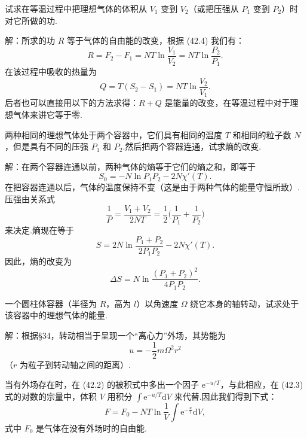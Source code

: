 \begin{xiti}

\quad 试求在等温过程中把理想气体的体积从 $V_1$ 变到 $V_2$（或把压强从 $P_1$ 变到 $P_2$）时对它所做的功.

解：所求的功 $R$ 等于气体的自由能的改变，根据 (42.4) 我们有：
\begin{equation*}
  R=F_2-F_1=NT\ln\frac{V_1}{V_2}=NT\ln\frac{P_2}{P_1}.
\end{equation*}
在该过程中吸收的热量为
\begin{equation*}
  Q=T\left(S_2-S_1\right)=NT\ln\frac{V_2}{V_1}.
\end{equation*}
后者也可以直接用以下的方法求得：$R+Q$ 是能量的改变，在等温过程中对于理想气体来讲它等于零.

\quad 两种相同的理想气体处于两个容器中，它们具有相同的温度 $T$ 和相同的粒子数 $N$，但是具有不同的压强 $P_1$ 和 $P_2$.然后把两个容器连通，试求熵的改变.

解：在两个容器连通以前，两种气体的熵等于它们的熵之和，即等于
\begin{equation*}
  S_0=-N\ln P_1P_2-2N\chi'(T).
\end{equation*}
在把容器连通以后，气体的温度保持不变（这是由于两种气体的能量守恒所致）.压强由关系式
\begin{equation*}
  \frac{1}{P}=\frac{V_1+V_2}{2NT}
  =\frac{1}{2}\Big(\frac{1}{P_1}+\frac{1}{P_2}\Big)
\end{equation*}
来决定.熵现在等于
\begin{equation*}
  S=2N\ln\frac{P_1+P_2}{2P_1P_2}-2N\chi'(T).
\end{equation*}
因此，熵的改变为
\begin{equation*}
  \Delta S=N\ln\frac{(P_1+P_2)^2}{4P_1P_2}.
\end{equation*}

\quad 一个圆柱体容器（半径为 $R$，高为 $l$）以角速度 $\Omega$ 绕它本身的轴转动，试求处于该容器中的理想气体的能量.

解：根据§34，转动相当于呈现一个“离心力”外场，其势能为
\begin{equation*}
  u=-\frac{1}{2}m\Omega^2r^2
\end{equation*}
（$r$ 为粒子到转动轴之间的距离）.

当有外场存在时，在 (42.2) 的被积式中多出一个因子 $\mathrm{e}^{-u/T}$，与此相应，在 (42.3) 式的对数的宗量中，体积 $V$ 用积分 $\int\mathrm{e}^{-u/T}\mathrm{d}V$ 来代替.因此我们得到下式：
\begin{equation*}
  F=F_0-NT\ln\frac{1}{V}\int\mathrm{e}^{-\frac{u}{T}}\mathrm{d}V,
\end{equation*}
式中 $F_0$ 是气体在没有外场时的自由能.


\end{xiti}
